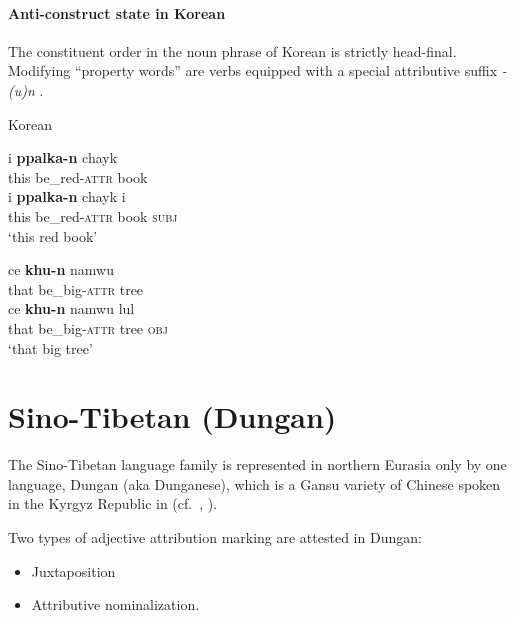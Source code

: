 \paragraph*{Anti\hyp{}construct state in Korean}
The constituent order in the noun phrase of Korean is strictly head-final. Modifying “property words” are verbs equipped with a special attributive suffix \textit{-(u)n} \citep{martin-etal1969}.
\begin{exe}
\ex \rm{Korean \citep[61]{chang1996}}
\begin{xlist}
\ex
\begin{xlist}
\ex
\gll	i \textbf{ppalka-n} chayk\\
	this be\_red-\textsc{attr} book\\
\ex	
\gll	i \textbf{ppalka-n} chayk i\\
	this be\_red-\textsc{attr} book \textsc{subj}\\
\glt	‘this red book’
\end{xlist}
\ex
\begin{xlist}
\ex	
\gll	ce \textbf{khu-n} namwu\\
	that be\_big-\textsc{attr} tree\\
\ex
\gll	ce \textbf{khu-n} namwu lul\\
	that be\_big-\textsc{attr} tree \textsc{obj}\\
\glt	‘that big tree’
\end{xlist}
\end{xlist}
\end{exe}

\section{Sino-Tibetan (Dungan)}\label{sinotibetan synchr}
The Sino-Tibetan language family is represented in northern Eurasia only by one language, Dungan (aka Dunganese), which is a Gansu variety of Chinese spoken in the Kyrgyz Republic in  (cf.~\citealt[85]{yuo2003}, \citealt{kalimov1968}).

Two types of adjective attribution marking are attested in Dungan:
\begin{itemize}
\item Juxtaposition
\item Attributive nominalization.
\end{itemize}

